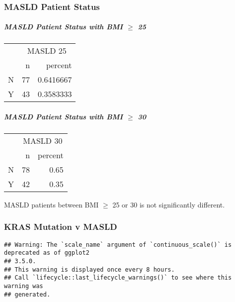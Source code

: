 \documentclass[
]{article}
\begin{document}
\hypertarget{masld-patient-status}{%
\subsubsection{MASLD Patient Status}\label{masld-patient-status}}

\hypertarget{masld-patient-status-with-bmi-ge-25}{%
\subparagraph{\texorpdfstring{MASLD Patient Status with BMI \(\ge\)
25}{MASLD Patient Status with BMI \textbackslash ge 25}}\label{masld-patient-status-with-bmi-ge-25}}

\begingroup
\fontsize{12.0pt}{14.4pt}\selectfont
\begin{longtable}{l|rr}
\toprule
 & \multicolumn{2}{c}{MASLD 25} \\ 
\cmidrule(lr){2-3}
 & n & percent \\ 
\midrule\addlinespace[2.5pt]
N & 77 & 0.6416667 \\ 
Y & 43 & 0.3583333 \\ 
\bottomrule
\end{longtable}
\endgroup

\hypertarget{masld-patient-status-with-bmi-ge-30}{%
\subparagraph{\texorpdfstring{MASLD Patient Status with BMI \(\ge\)
30}{MASLD Patient Status with BMI \textbackslash ge 30}}\label{masld-patient-status-with-bmi-ge-30}}

\begingroup
\fontsize{12.0pt}{14.4pt}\selectfont
\begin{longtable}{l|rr}
\toprule
 & \multicolumn{2}{c}{MASLD 30} \\ 
\cmidrule(lr){2-3}
 & n & percent \\ 
\midrule\addlinespace[2.5pt]
N & 78 & 0.65 \\ 
Y & 42 & 0.35 \\ 
\bottomrule
\end{longtable}
\endgroup

MASLD patients between BMI \(\ge\) 25 or 30 is not significantly
different.

\hypertarget{kras-mutation-v-masld}{%
\subsubsection{KRAS Mutation v MASLD}\label{kras-mutation-v-masld}}

\begin{verbatim}
## Warning: The `scale_name` argument of `continuous_scale()` is deprecated as of ggplot2
## 3.5.0.
## This warning is displayed once every 8 hours.
## Call `lifecycle::last_lifecycle_warnings()` to see where this warning was
## generated.
\end{verbatim}
\end{document}
